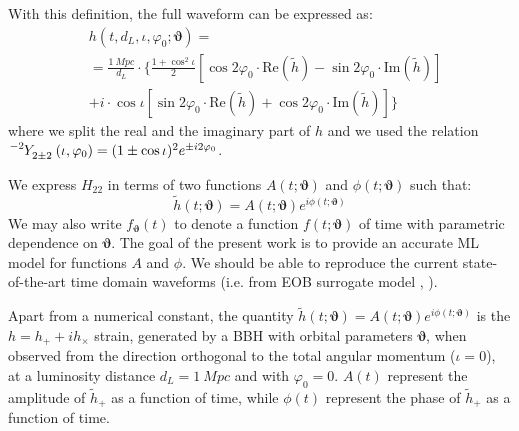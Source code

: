 With this definition, the full waveform can be expressed as:
\begin{align} 
	&h(t, d_L,\iota,\varphi_0; \boldsymbol{\vartheta}) =  \nonumber\\
		&= {\frac{\SI{1}{Mpc}}{d_L}} \cdot \Bigg\{ \frac{1+\cos^2\iota}{2} \left[ \cos 2\varphi_0 \cdot \mathrm{Re}(\tilde{h}) 
			- \sin 2\varphi_0 \cdot \mathrm{Im}(\tilde{h}) \right] \nonumber \\
		&+  i \cdot \cos\iota \left[ \sin 2\varphi_0 \cdot \mathrm{Re}(\tilde{h}) 
			+ \cos 2\varphi_0 \cdot \mathrm{Im}(\tilde{h})  \right] \Bigg\}
\label{eq:h_parametrization_simple}
\end{align}
where we split the real and the imaginary part of $h$ and we used the relation ${\tensor[^{-2}]{Y}{_{2 \pm 2}}(\iota, \varphi_0) = (1 \pm \cos \iota)^2 e^{\pm i 2 \varphi_0}}$.
\par
We express $H_{22}$ in terms of two functions $A(t; \boldsymbol{\vartheta})$ and $\phi(t; \boldsymbol{\vartheta})$ such that:
\begin{equation}\label{eq:h_ML}
	\tilde{h}(t; \boldsymbol{\vartheta}) = A(t; \boldsymbol{\vartheta}) e^{i \phi(t; \boldsymbol{\vartheta})} 
\end{equation}
We may also write $f_{\boldsymbol{\vartheta}}(t)$ to denote a function $f(t;\boldsymbol{\vartheta})$ of time with parametric dependence on $\boldsymbol{\vartheta}$.
The goal of the present work is to provide an accurate ML model for functions $A$ and $\phi$.
We should be able to reproduce the current state-of-the-art time domain waveforms (i.e. from EOB surrogate model \cite{Damour1999EOB}, \cite{Damour2009EOB} \cite{Nagar2018TEOBResumS}).
\par
Apart from a numerical constant, the quantity ${\tilde{h}(t; \boldsymbol{\vartheta}) = A(t; \boldsymbol{\vartheta}) e^{i \phi(t; \boldsymbol{\vartheta})}}$ is the $h = h_+ +i h_\times$ strain, generated by a BBH with orbital parameters $\boldsymbol{\vartheta}$, when observed from the direction orthogonal to the total angular momentum ($\iota =0$), at a luminosity distance $d_L = \SI{1}{Mpc}$ and with $\varphi_0 =0$.
$A(t)$ represent the amplitude of $\tilde{h}_+$ as a function of time, while $\phi(t)$ represent the phase of $\tilde{h}_+$ as a function of time.
